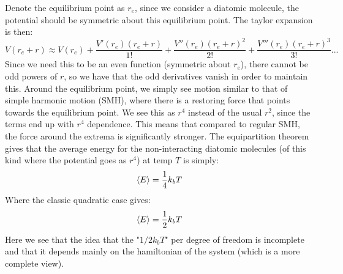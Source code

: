 Denote the equilibrium point as $r_e$, since we consider a diatomic molecule, the potential should be symmetric about this equilibrium point.
The taylor expansion is then:
\begin{equation}
    V(r_e+r) \approx V(r_e) + \frac{V'(r_e)(r_e + r)}{1!} + \frac{V''(r_e)(r_e+r)^2}{2!} + \frac{V'''(r_e)(r_e+r)^3}{3!}...
\end{equation}
Since we need this to be an even function (symmetric about $r_e$), there cannot be odd powers of $r$, so we have that the odd derivatives vanish in order to maintain this.
Around the equilibrium point, we simply see motion similar to that of simple harmonic motion (SMH), where there is a restoring force that points towards the equilibrium point. We see this as $r^4$ instead of the usual $r^2$, since the terms end up with $r^4$ dependence. This means that compared to regular SMH, the force around the extrema is significantly stronger.
The equipartition theorem gives that the average energy for the non-interacting diatomic molecules (of this kind where the potential goes as $r^4$) at temp $T$ is simply:
\begin{equation}
    \braket{E} = \frac{1}{4}k_b T 
\end{equation}
Where the classic quadratic case gives:
\begin{equation}
    \braket{E} = \frac{1}{2}k_b T
\end{equation}
Here we see that the idea that the "$1/2 k_b T$" per degree of freedom is incomplete and that it depends mainly on the hamiltonian of the system (which is a more complete view).